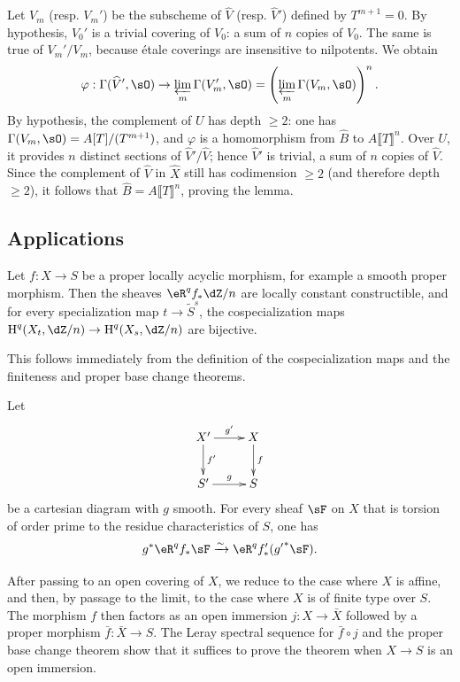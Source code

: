 Let $V_m$ (resp. $V_m'$) be the subscheme of $\widehat V$ (resp.
$\widehat V'$) defined by $T^{m+1}=0$. By hypothesis, $V_0'$ is a
trivial covering of $V_0$: a sum of $n$ copies of $V_0$. The same is true
of $V_m'/V_m$, because étale coverings are insensitive to nilpotents.
We obtain
\[
  \varphi : \Gamma(\widehat V',\sO) \to \varprojlim_m \Gamma(V_m',\sO) = \left(\varprojlim_m \Gamma(V_m,\sO)\right)^n \text{.}
\]
By hypothesis, the complement of $U$ has depth $\geqslant2$: one has
$\Gamma(V_m,\sO)=A[T]/(T^{m+1})$, and $\varphi$ is a homomorphism from
$\widehat B$ to $A\llbracket T\rrbracket^n$. Over $U$, it provides $n$
distinct sections of $\widehat V'/\widehat V$; hence $\widehat V'$ is
trivial, a sum of $n$ copies of $\widehat V$. Since the complement of
$\widehat V$ in $\widehat X$ still has codimension $\geqslant2$ (and
therefore depth $\geqslant2$), it follows that
$\widehat B=A\llbracket T\rrbracket^n$, proving the lemma.

\subsection{Applications}\label{I:5-3}

\begin{theorem}\label{I:5-3-1}
Let $f:X\to S$ be a proper locally acyclic morphism, for example a smooth
proper morphism. Then the sheaves $\eR^qf_*\dZ/n$ are locally constant
constructible, and for every specialization map $t\to\widetilde S^s$,
the cospecialization maps
$\h^q(X_t,\dZ/n)\to\h^q(X_s,\dZ/n)$ are bijective.
\end{theorem}

This follows immediately from the definition of the cospecialization maps
and the finiteness and proper base change theorems.

\begin{theorem}\label{I:5-3-2}
Let
\[\xymatrix{
  X' \ar[r]^-{g'} \ar[d]^-{f'}
    & X \ar[d]^-f \\
  S' \ar[r]^-{g}
    & S
}\]
be a cartesian diagram with $g$ smooth. For every sheaf $\sF$ on $X$
that is torsion of order prime to the residue characteristics of $S$,
one has
\[
  g^* \eR^q f_* \sF \iso \eR^q f'_*({g'}^* \sF) \text{.}
\]
\end{theorem}

After passing to an open covering of $X$, we reduce to the case where
$X$ is affine, and then, by passage to the limit, to the case where $X$
is of finite type over $S$. The morphism $f$ then factors as an open
immersion $j:X\to\bar X$ followed by a proper morphism
$\bar f:\bar X\to S$. The Leray spectral sequence for $\bar f\circ j$
and the proper base change theorem show that it suffices to prove the
theorem when $X\to S$ is an open immersion.

